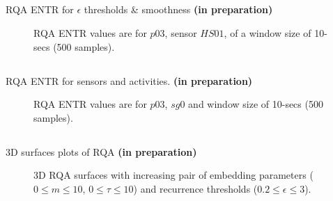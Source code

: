 \subsection{}
{

\begin{frame}{RQA ENTR for $\epsilon$ thresholds
	\& smoothness
	{\bf (in preparation)}
}
    \begin{figure}
	\caption{
	RQA ENTR values are for
	$p03$, sensor $HS01$, of a window size of 10-secs (500 samples).
} 
   \end{figure}
	
\end{frame}
}



\subsection{}
{

\begin{frame}{RQA ENTR for sensors and activities.
	{\bf (in preparation)}
}
    \begin{figure}
	\caption{
	RQA ENTR values are for
	$p03$, $sg0$ and window size of 10-secs (500 samples).
} 
   \end{figure}
	
\end{frame}
}










\subsection{}
{

\begin{frame}{3D surfaces plots of RQA
	{\bf (in preparation)}
}
    \begin{figure}
	\small
	\caption{
		3D RQA surfaces 
	with increasing pair of embedding parameters 
	($0 \le m \le 10$, $0 \le \tau \le 10$) 
	and recurrence thresholds ($ 0.2 \le \epsilon \le 3 $).
	} 
   \end{figure}
	
\end{frame}
}




